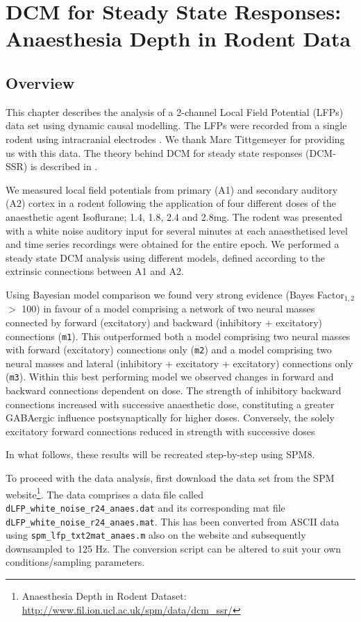 \chapter{DCM for Steady State Responses: Anaesthesia Depth in Rodent Data\label{chapter:data:dcm_ssr}}

\section{Overview}

This chapter describes the analysis of a 2-channel Local Field Potential (LFPs) data set using dynamic causal modelling. The LFPs were recorded from a single rodent using intracranial electrodes \cite{dcm_ssr_anaesthesia}. We thank Marc Tittgemeyer for providing us with this data. The theory behind DCM for steady state responses (DCM-SSR) is described in \cite{dcm_ssr}.

We measured local field potentials from primary (A1) and secondary auditory (A2) cortex in a rodent following the application of four different doses of the anaesthetic agent Isoflurane; 1.4, 1.8, 2.4 and 2.8mg. The rodent was presented with a white noise auditory input for several minutes at each anaesthetised level and time series recordings were obtained for the entire epoch. We performed a steady state DCM analysis using different models, defined according to the extrinsic connections between A1 and A2.

Using Bayesian model comparison we found very strong evidence (Bayes Factor$_{1,2}$ $>$ 100) in favour of a model comprising a network of two neural masses connected by forward (excitatory) and backward (inhibitory + excitatory) connections (\texttt{m1}). This outperformed both a model comprising two neural masses with forward (excitatory) connections only (\texttt{m2}) and a model comprising two neural masses and lateral (inhibitory + excitatory + excitatory) connections only (\texttt{m3}). Within this best performing model we observed changes in forward and backward connections dependent on dose. The strength of inhibitory backward connections increased with successive anaesthetic dose, constituting a greater GABAergic influence postsynaptically for higher doses. Conversely, the solely excitatory forward connections reduced in strength with successive doses

In what follows, these results will be recreated step-by-step using SPM8.

To proceed with the data analysis, first download the data set from the SPM website\footnote{Anaesthesia Depth in Rodent Dataset: \url{http://www.fil.ion.ucl.ac.uk/spm/data/dcm_ssr/}}. The data comprises a data file called \texttt{dLFP\_white\_noise\_r24\_anaes.dat} and its corresponding mat file \texttt{dLFP\_white\_noise\_r24\_anaes.mat}. This has been converted from ASCII data using \texttt{spm\_lfp\_txt2mat\_anaes.m} also on the website and subsequently downsampled to 125 Hz. The conversion script can be altered to suit your own conditions/sampling parameters.

